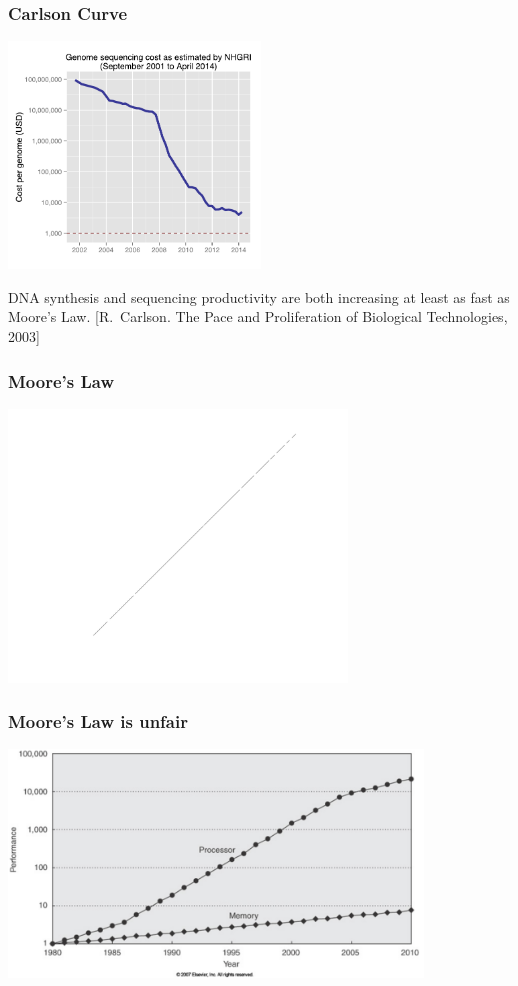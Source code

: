 \begin{frame}\frametitle{Carlson Curve}
\includegraphics[width=6.7cm]{Historic_cost_of_sequencing_a_human_genome.pdf}

\small
DNA synthesis and sequencing productivity are both increasing at least as fast as Moore's Law.
[R.~Carlson.
The Pace and Proliferation of Biological Technologies, 2003]
\end{frame}



\begin{frame}\frametitle{Moore's Law}
\includegraphics[width=9cm]{Moore_Law2.png}
\end{frame}


\begin{frame}\frametitle{Moore's Law is unfair}
\includegraphics[width=11cm]{memory-cpu-gap.png}
\end{frame}

